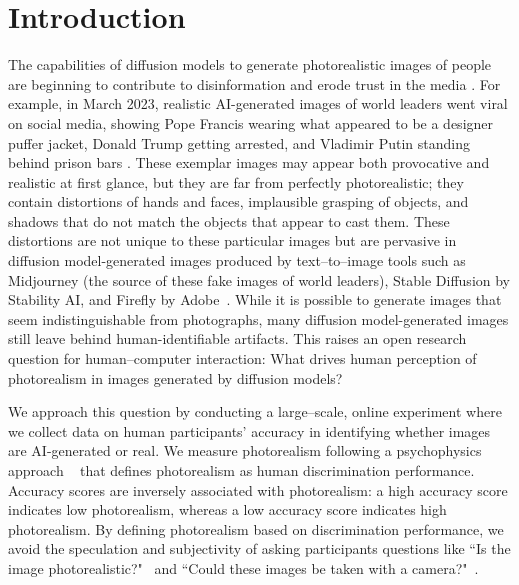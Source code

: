 \section{Introduction}
The capabilities of diffusion models to generate photorealistic images of people are beginning to contribute to disinformation and erode trust in the media \cite{epstein2023art}. For example, in March 2023, realistic AI-generated images of world leaders went viral on social media, showing Pope Francis wearing what appeared to be a designer puffer jacket, Donald Trump getting arrested, and Vladimir Putin standing behind prison bars \cite{apnews2024}. These exemplar images may appear both provocative and realistic at first glance, but they are far from perfectly photorealistic; they contain distortions of hands and faces, implausible grasping of objects, and shadows that do not match the objects that appear to cast them. These distortions are not unique to these particular images but are pervasive in diffusion model-generated images produced by text--to--image tools such as Midjourney (the source of these fake images of world leaders), Stable Diffusion by Stability AI, and Firefly by Adobe~\cite{kamali2024distinguish}. While it is possible to generate images that seem indistinguishable from photographs, many diffusion model-generated images still leave behind human-identifiable artifacts. This raises an open research question for human--computer interaction: What drives human perception of photorealism in images generated by diffusion models?

We approach this question by conducting a large--scale, online experiment where we collect data on human participants' accuracy in identifying whether images are AI-generated or real. We measure photorealism following a psychophysics approach ~\cite{zhou2019hype} that defines photorealism as human discrimination performance. Accuracy scores are inversely associated with photorealism: a high accuracy score indicates low photorealism, whereas a low accuracy score indicates high photorealism. By defining photorealism based on discrimination performance, we avoid the speculation and subjectivity of asking participants questions like ``Is the image photorealistic?"~\cite{liang2024rich} and ``Could these images be taken with a camera?"~\cite{yan2024sanitycheckaigeneratedimage}. 

